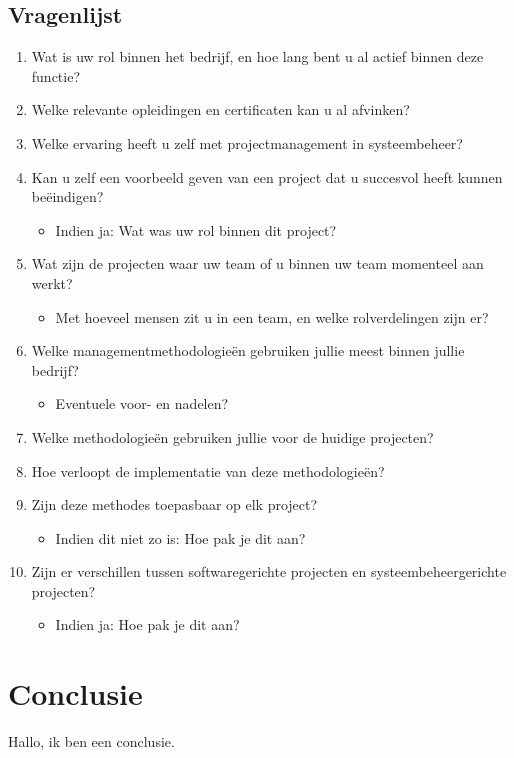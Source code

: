 \documentclass{article}
\begin{document}
    \subsection{Vragenlijst}
    \begin{enumerate}
        \item Wat is uw rol binnen het bedrijf, en hoe lang bent u al actief binnen deze functie?
        \item Welke relevante opleidingen en certificaten kan u al afvinken?
        \item Welke ervaring heeft u zelf met projectmanagement in systeembeheer?
        \item Kan u zelf een voorbeeld geven van een project dat u succesvol heeft kunnen beëindigen?
        \begin{itemize}
            \item Indien ja: Wat was uw rol binnen dit project?
        \end{itemize}
        \item Wat zijn de projecten waar uw team of u binnen uw team momenteel aan werkt?
        \begin{itemize}
            \item Met hoeveel mensen zit u in een team, en welke rolverdelingen zijn er?
        \end{itemize}
        \item Welke managementmethodologieën gebruiken jullie meest binnen jullie bedrijf?
        \begin{itemize}
            \item Eventuele voor- en nadelen?
        \end{itemize}
        \item Welke methodologieën gebruiken jullie voor de huidige projecten?
        \item Hoe verloopt de implementatie van deze methodologieën?
        \item Zijn deze methodes toepasbaar op elk project?
        \begin{itemize}
            \item Indien dit niet zo is: Hoe pak je dit aan?
        \end{itemize}
        \item Zijn er verschillen tussen softwaregerichte projecten en systeembeheergerichte projecten?
        \begin{itemize}
            \item Indien ja: Hoe pak je dit aan?
        \end{itemize}
    \end{enumerate}

    \section{Conclusie}
    
    Hallo, ik ben een conclusie.

    \newpage
    \printbibliography
\end{document}
